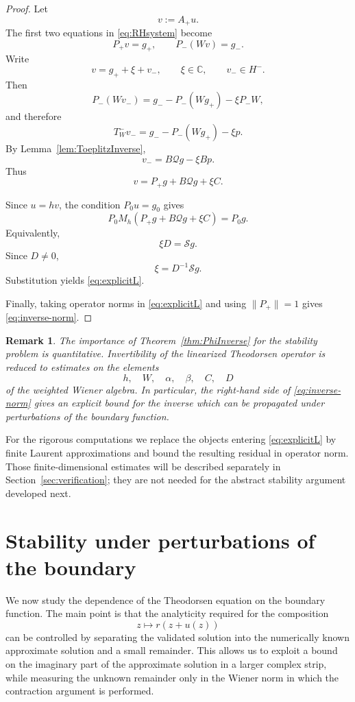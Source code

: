 \documentclass[11pt,a4paper]{amsart}
\newtheorem{remark}[theorem]{Remark}
\begin{document}
\begin{proof}
	Let
	\[
	v:=A_+u.
	\]
	The first two equations in \eqref{eq:RHsystem} become
	\[
	P_+v=g_+,
	\qquad
	P_-(Wv)=g_-.
	\]
	Write
	\[
	v=g_++\xi+v_-,
	\qquad
	\xi\in\mathbb C,
	\qquad
	v_-\in H^-.
	\]
	Then
	\[
	P_-(Wv_-)
	=
	g_--P_-(Wg_+)-\xi P_-W,
	\]
	and therefore
	\[
	T_W^-v_-
	=
	g_--P_-(Wg_+)-\xi p.
	\]
	By Lemma~\ref{lem:ToeplitzInverse},
	\[
	v_-
	=
	B\mathcal Qg-\xi Bp.
	\]
	Thus
	\[
	v
	=
	P_+g+B\mathcal Qg+\xi C.
	\]
	
	Since $u=hv$, the condition $P_0u=g_0$ gives
	\[
	P_0M_h
	\left(
	P_+g+B\mathcal Qg+\xi C
	\right)
	=
	P_0g.
	\]
	Equivalently,
	\[
	\xi D=\mathcal Sg.
	\]
	Since $D\ne0$,
	\[
	\xi=D^{-1}\mathcal Sg.
	\]
	Substitution yields \eqref{eq:explicitL}.
	
	Finally, taking operator norms in \eqref{eq:explicitL} and using
	$\|P_+\|=1$ gives \eqref{eq:inverse-norm}.
\end{proof}

\begin{remark}\label{rem:quantitative-inverse}
	The importance of Theorem~\ref{thm:PhiInverse} for the stability
	problem is quantitative. Invertibility of the linearized Theodorsen
	operator is reduced to estimates on the elements
	\[
	h,\quad W,\quad \alpha,\quad\beta,\quad C,\quad D
	\]
	of the weighted Wiener algebra. In particular, the right-hand side of
	\eqref{eq:inverse-norm} gives an explicit bound for the inverse which
	can be propagated under perturbations of the boundary function.
\end{remark}

For the rigorous computations we replace the objects entering
\eqref{eq:explicitL} by finite Laurent approximations and bound the
resulting residual in operator norm. Those finite-dimensional
estimates will be described separately in
Section~\ref{sec:verification}; they are not needed for the abstract
stability argument developed next.

\section{Stability under perturbations of the boundary}
\label{sec:stability}

We now study the dependence of the Theodorsen equation on the
boundary function. The main point is that the analyticity required
for the composition
\[
z\longmapsto r(z+u(z))
\]
can be controlled by separating the validated solution into the
numerically known approximate solution and a small remainder. This
allows us to exploit a bound on the imaginary part of the approximate
solution in a larger complex strip, while measuring the unknown
remainder only in the Wiener norm in which the contraction argument
is performed.
\end{document}
